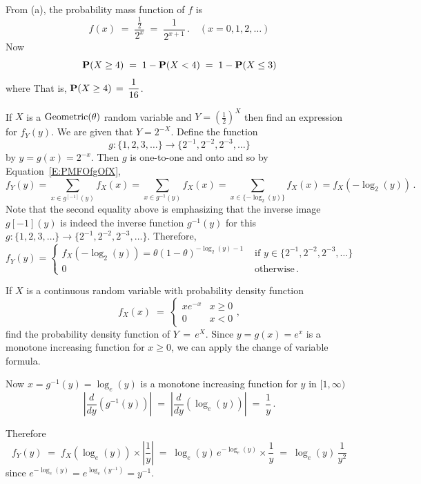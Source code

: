 \begin{ExerciseList}
\item From (a), the probability mass function of $f$ is
  $$f(x)\;=\;\frac{\frac{1}{2}}{2^{x}}\;=\;\frac{1}{2^{x+1}}\,.\quad
  (x=0,1,2,\dots)$$ Now
\[\mathbf{P}(X\geq 4)\;=\;1-\mathbf{P}(X<4)\;=\;1-\mathbf{P}(X\leq3)\] where
That is,  $\mathbf{P}(X\geq4)\,=\,\displaystyle \frac{1}{16}$.
\ee

\Exercise
If $X$ is a $\mbox{{\rm Geometric}}(\theta)$ random variable and $Y=\left(\frac{1}{2}\right)^X$ then find an expression for $f_Y(y)$.
\Answer
We are given that $Y=2^{-X}$. Define the function
$$g: \{1,2,3,\ldots\} \to \{2^{-1},2^{-2},2^{-3},\ldots\}$$
by $y=g(x)=2^{-x}$.  Then $g$ is one-to-one and onto and so by Equation~\eqref{E:PMFOfgOfX},
\[
f_Y(y) = \sum_{x \in g^{[-1]}(y)} f_X(x) = \sum_{x \in g^{-1}(y)} f_X(x) = \sum_{x \in \{ -\log_2(y) \} } f_X(x) = f_X(-\log_2(y))\, .
\]
Note that the second equality above is emphasizing that the inverse image $g{[-1]}(y)$ is indeed the inverse function $g^{-1}(y)$ for this $g:\{1,2,3,\ldots\} \to \{2^{-1},2^{-2},2^{-3},\ldots\}$.  Therefore,
\[
f_Y(y) = 
\begin{cases}
f_X(-\log_2(y)) = \theta (1-\theta)^{-\log_2(y)-1} & \text{ if } y \in \{2^{-1},2^{-2},2^{-3},\ldots\}\\
0 & \text{ otherwise} \, .
\end{cases}
\]

\Exercise
If $X$ is a continuous random variable with probability density function
\[
f_X(x)\;=\;\begin{cases} x e^{- x} &  x\geqslant 0\\ 0 & x< 0\end{cases},
\]
find the probability density function of $Y\,=\, e^X$.
\Answer
Since  $y=g(x) = e^x$ is a monotone increasing function for $x \geqslant 0$,  we can apply the change of variable formula.

Now $x= g^{-1}(y) = \log_e(y)$ is a monotone increasing function for $y$ in $[1,\infty)$
\[\left|  \frac{d}{dy}\left(g^{-1}(y)\right)\right|\;=\; \left|  \frac{d}{dy}\left(\log_e(y)\right)\right|\;=\; \frac{1}{y}\,.\]

Therefore
\[
  f_Y(y) \;=\; f_X\left( \log_e(y)\right) \times  \left| \frac{1}{y} \right|\;=\;  \log_e(y) \,e^{-\log_e(y)} \times  \frac{1}{y} \;=\; \log_e(y) \, \frac{1}{y^2}
\]
since $e^{-\log_e(y)} = e^{\log_e(y^{-1})}  = y^{-1}$.


\end{ExerciseList}
